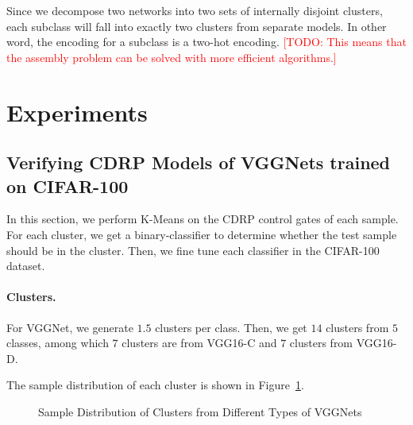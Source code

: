 \documentclass[sigplan,10pt,review]{acmart}\settopmatter{printfolios=true,printccs=false,printacmref=false}
\newcommand{\todo}[1]{\textcolor{red}{[TODO: #1]}}
\begin{document}
Since we decompose two networks into two sets of internally disjoint clusters, each subclass will fall into exactly two clusters from separate models.
In other word, the encoding for a subclass is a two-hot encoding.
\todo{This means that the assembly problem can be solved with more efficient algorithms.}

\section{Experiments}
\subsection{Verifying CDRP Models of VGGNets trained on CIFAR-100}
In this section, we perform K-Means on the CDRP control gates of each sample. For each cluster, we get a binary-classifier to determine whether the test sample should be in the cluster. Then, we fine tune each classifier in the CIFAR-100 dataset.

\paragraph{Clusters.} For VGGNet, we generate $1.5$ clusters per class.
Then, we get $14$ clusters from $5$ classes, among which $7$ clusters are from VGG16-C and $7$ clusters from VGG16-D. 

The sample distribution of each cluster is shown in Figure~\ref{fig:vgg-cluster}.

\begin{figure}[!htp]
    \centering
{}

{}
    \caption{Sample Distribution of Clusters from Different Types of VGGNets}
    \label{fig:vgg-cluster}

\end{figure}
\end{document}

